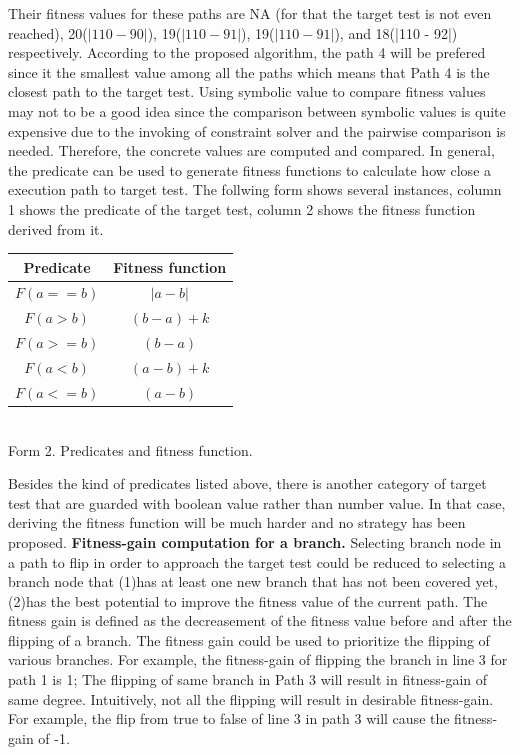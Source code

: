 Their fitness values for these paths are NA (for that the target test is not even reached), 20($|110 - 90|$), 19($|110 - 91|$), 19($|110 - 91|$), and 18(|110 - 92|) respectively. According to the proposed algorithm, the path 4 will be prefered since it the smallest value among all the paths which means that Path 4 is the closest path to the target test. Using symbolic value to compare fitness values may not to be a good idea since the comparison between symbolic values is quite expensive due to the invoking of constraint solver and the pairwise comparison is needed. Therefore, the concrete values are computed and compared. In general,  the predicate can be used to generate fitness functions to calculate how close a execution path to target test. The follwing form shows several instances, column 1 shows the predicate of the target test, column 2 shows the fitness function derived from it.\\
\begin{center}
\begin{tabular}{|c|c|}\hline
Predicate & Fitness function \\\hline
$F(a==b)$ & $|a-b|$ \\\hline
$F(a>b)$ & $(b-a)+k$ \\\hline
$F(a>=b)$ & $(b-a)$ \\\hline
$F(a<b)$ & $(a-b)+k$ \\\hline
$F(a<=b)$ & $(a-b)$ \\\hline
\end{tabular}\\
Form 2. Predicates and fitness function.
\end{center}
Besides the kind of predicates listed above, there is another category of target test that are guarded with boolean value rather than number value. In that case, deriving the fitness function will be much harder and no strategy has been proposed.
\indent\textbf{Fitness-gain computation for a branch.} Selecting branch node in a path to flip in order to approach the target test could be reduced to selecting a branch node that (1)has at least one new branch that has not been covered yet,(2)has the best potential to improve the fitness value of the current path. The fitness gain is defined as the decreasement of the fitness value before and after the flipping of a branch. The fitness gain could be used to prioritize the flipping of various branches. For example, the fitness-gain of flipping the branch in line 3 for path 1 is 1; The flipping of same branch in Path 3 will result in fitness-gain of same degree. Intuitively, not all the flipping will result in desirable fitness-gain. For example, the flip from true to false of line 3 in path 3 will cause the fitness-gain of -1.\\
